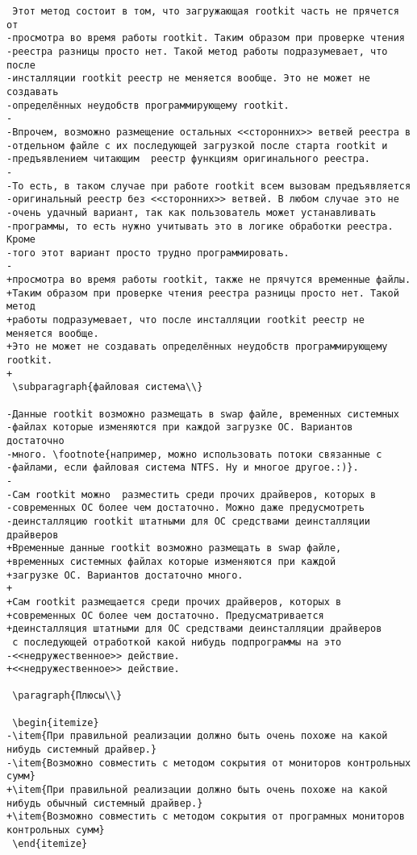 \begin{verbatim}
 Этот метод состоит в том, что загружающая rootkit часть не прячется от
-просмотра во время работы rootkit. Таким образом при проверке чтения
-реестра разницы просто нет. Такой метод работы подразумевает, что после
-инсталляции rootkit реестр не меняется вообще. Это не может не создавать
-определённых неудобств программирующему rootkit.
-
-Впрочем, возможно размещение остальных <<сторонних>> ветвей реестра в
-отдельном файле с их последующей загрузкой после старта rootkit и
-предъявлением читающим  реестр функциям оригинального реестра.
-
-То есть, в таком случае при работе rootkit всем вызовам предъявляется
-оригинальный реестр без <<сторонних>> ветвей. В любом случае это не
-очень удачный вариант, так как пользователь может устанавливать
-программы, то есть нужно учитывать это в логике обработки реестра. Кроме
-того этот вариант просто трудно программировать.
-
+просмотра во время работы rootkit, также не прячутся временные файлы.
+Таким образом при проверке чтения реестра разницы просто нет. Такой метод
+работы подразумевает, что после инсталляции rootkit реестр не меняется вообще.
+Это не может не создавать определённых неудобств программирующему rootkit.
+
 \subparagraph{файловая система\\}

-Данные rootkit возможно размещать в swap файле, временных системных
-файлах которые изменяются при каждой загрузке ОС. Вариантов достаточно
-много. \footnote{например, можно использовать потоки связанные с
-файлами, если файловая система NTFS. Ну и многое другое.:)}.
-
-Сам rootkit можно  разместить среди прочих драйверов, которых в
-современных ОС более чем достаточно. Можно даже предусмотреть
-деинсталляцию rootkit штатными для ОС средствами деинсталляции драйверов
+Временные данные rootkit возможно размещать в swap файле,
+временных системных файлах которые изменяются при каждой
+загрузке ОС. Вариантов достаточно много.
+
+Сам rootkit размещается среди прочих драйверов, которых в
+современных ОС более чем достаточно. Предусматривается
+деинсталляция штатными для ОС средствами деинсталляции драйверов
 с последующей отработкой какой нибудь подпрограммы на это
-<<недружественное>> действие.
+<<недружественное>> действие.

 \paragraph{Плюсы\\}

 \begin{itemize}
-\item{При правильной реализации должно быть очень похоже на какой нибудь системный драйвер.}
-\item{Возможно совместить с методом сокрытия от мониторов контрольных сумм}
+\item{При правильной реализации должно быть очень похоже на какой нибудь обычный системный драйвер.}
+\item{Возможно совместить с методом сокрытия от програмных мониторов контрольных сумм}
 \end{itemize}


\end{verbatim}

